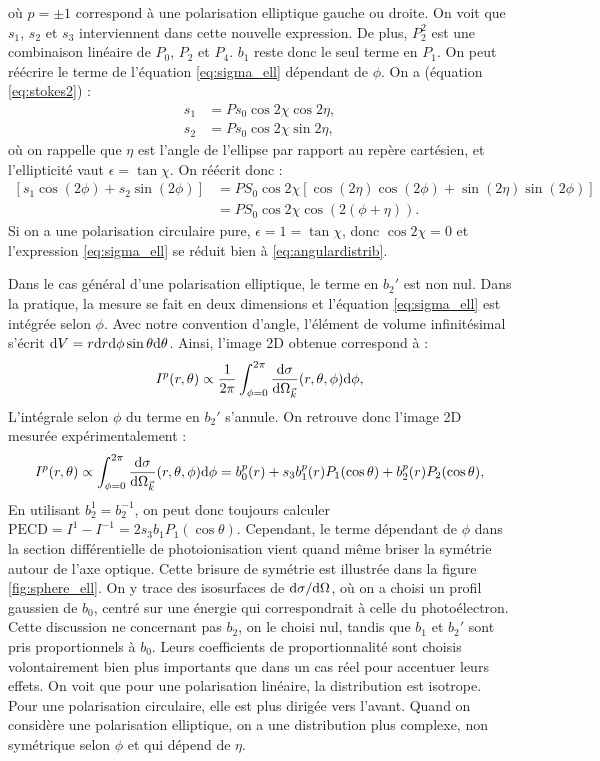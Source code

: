 où $p=\pm1$ correspond à une polarisation elliptique gauche ou droite. On voit que $s_1$, $s_2$ et $s_3$ interviennent dans cette nouvelle expression. De plus, $P_2^2$ est une combinaison linéaire de $P_0$, $P_2$ et $P_4$. $b_1$ reste donc le seul terme en $P_1$. On peut réécrire le terme de l'équation \ref{eq:sigma_ell} dépendant de $\phi$. On a (équation \ref{eq:stokes2}) :
\begin{align}
s_1 &= Ps_0\cos 2\chi\cos 2\eta ,\\
s_2 &= Ps_0\cos 2\chi\sin 2\eta,
\end{align}
où on rappelle que $\eta$ est l'angle de l'ellipse par rapport au repère cartésien, et l'ellipticité vaut $\epsilon=\tan\chi$. On réécrit donc :
\begin{align}
\left[s_1\cos(2\phi)+s_2\sin(2\phi)\right] &= PS_0\cos 2\chi\left[\cos(2\eta)\cos(2\phi)+\sin(2\eta)\sin(2\phi)\right]\\
&= PS_0\cos 2\chi \cos(2(\phi+\eta)).
\end{align}
Si on a une polarisation circulaire pure, $\epsilon = 1 = \tan\chi$, donc $\cos2\chi = 0$ et l'expression \ref{eq:sigma_ell} se réduit bien à \ref{eq:angulardistrib}.

Dans le cas général d'une polarisation elliptique, le terme en $b_2'$ est non nul. Dans la pratique, la mesure se fait en deux dimensions et l'équation \ref{eq:sigma_ell} est intégrée selon $\phi$. Avec notre convention d'angle, l'élément de volume infinitésimal s'écrit $\mathrm{d} V = r\mathrm{d} r \mathrm{d} \phi \sin\theta \mathrm{d} \theta$. Ainsi, l'image 2D obtenue correspond à :
\begin{equation}
I^p(r,\theta) \propto \frac{1}{2\pi}\int_{\phi=0}^{2\pi}\frac{\mathrm{d}\sigma}{\mathrm{d}\Omega_{\vec{k}}}(r,\theta,\phi)\mathrm{d}\phi,
\end{equation}
L'intégrale selon $\phi$ du terme en $b_2'$ s'annule. On retrouve donc l'image 2D mesurée expérimentalement :
\begin{equation}
I^p(r,\theta) \propto \int_{\phi=0}^{2\pi}\frac{\mathrm{d}\sigma}{\mathrm{d}\Omega_{\vec{k}}}(r,\theta,\phi)\mathrm{d}\phi = b_0^p(r)+s_3b_1^p(r)P_1(\cos\theta)+b_2^p(r)P_2(\cos\theta),
\end{equation}
En utilisant $b_2^1=b_2^{-1}$, on peut donc toujours calculer $\text{PECD} = I^1-I^{-1} = 2s_3b_1P_1(\cos\theta)$. Cependant, le terme dépendant de $\phi$ dans la section différentielle de photoionisation vient quand même briser la symétrie autour de l'axe optique. Cette brisure de symétrie est illustrée dans la figure \ref{fig:sphere_ell}. On y trace des isosurfaces de $\mathrm{d}\sigma/\mathrm{d}\Omega$, où on a choisi un profil gaussien de $b_0$, centré sur une énergie qui correspondrait à celle du photoélectron. Cette discussion ne concernant pas $b_2$, on le choisi nul, tandis que $b_1$ et $b_2'$ sont pris proportionnels à $b_0$. Leurs coefficients de proportionnalité sont choisis volontairement bien plus importants que dans un cas réel pour accentuer leurs effets. On voit que pour une polarisation linéaire, la distribution est isotrope. Pour une polarisation circulaire, elle est plus dirigée vers l'avant. Quand on considère une polarisation elliptique, on a une distribution plus complexe, non symétrique selon $\phi$ et qui dépend de $\eta$.

